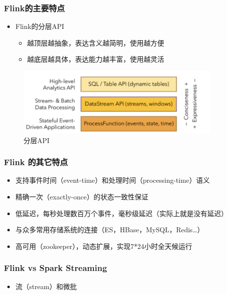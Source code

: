 \documentclass{beamer}
\begin{document}
  \begin{frame}
    \frametitle{Flink的主要特点}
  
    \begin{itemize}
      \item Flink的分层API
        \begin{itemize}
          \item 越顶层越抽象，表达含义越简明，使用越方便
          \item 越底层越具体，表达能力越丰富，使用越灵活
        \end{itemize}
    \end{itemize}

    \begin{figure}
      \centering
      \includegraphics[width=0.9\textwidth]{image11.png}
      \caption{分层API}
    \end{figure}
  
  \end{frame}

  \begin{frame}
    \frametitle{Flink 的其它特点}

    \begin{itemize}
      \item 支持事件时间（event-time）和处理时间（processing-time）语义
      \item 精确一次（exactly-once）的状态一致性保证
      \item 低延迟，每秒处理数百万个事件，毫秒级延迟（实际上就是没有延迟）
      \item 与众多常用存储系统的连接（ES，HBase，MySQL，Redis…）
      \item 高可用（zookeeper），动态扩展，实现7*24小时全天候运行
    \end{itemize}
  
  \end{frame}

  \begin{frame}
    \frametitle{Flink vs Spark Streaming}
  
    \begin{itemize}
      \item 流（stream）和微批
    \end{itemize}
  
  \end{frame}
\end{document}
